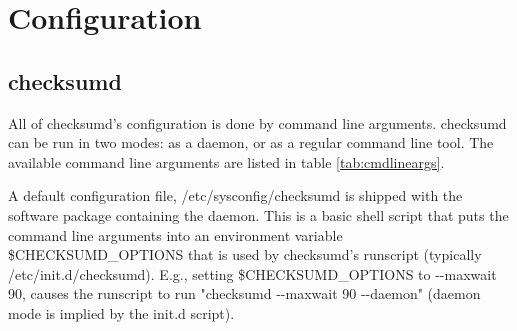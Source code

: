 \section{Configuration}

\subsection{checksumd}
All of checksumd's configuration is done by command line arguments. checksumd can be run in two modes: as a daemon, or as a regular command line tool. The available command line arguments are listed in table \ref{tab:cmdlineargs}.


A default configuration file, /etc/sysconfig/checksumd is shipped with the software package containing the daemon. This is a basic shell script that puts the command line arguments into an environment variable \$CHECKSUMD\_OPTIONS that is used by checksumd's runscript (typically /etc/init.d/checksumd). E.g., setting \$CHECKSUMD\_OPTIONS to -{}-maxwait 90, causes the runscript to run "checksumd -{}-maxwait 90 -{}-daemon" (daemon mode is implied by the init.d script).


